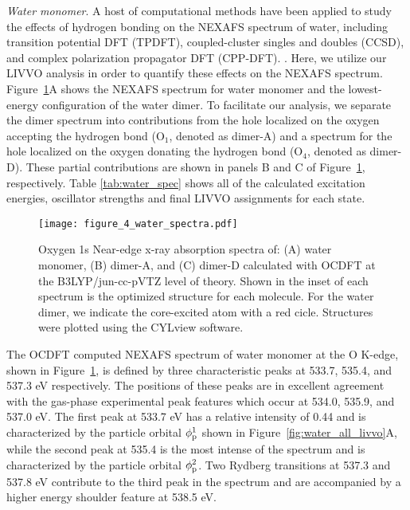 \documentclass{article}
\begin{document}
\textit{Water monomer}. 
A host of computational methods have been applied to study the effects of hydrogen bonding on the NEXAFS spectrum of water, including transition potential DFT (TPDFT), \cite{prendergast_x-ray_2006-2,iannuzzi_x-ray_2008,leetmaa_theoretical_2010,hetenyi_calculation_2004,cavalleri_half_2005} coupled-cluster singles and doubles (CCSD), \cite{coriani_coupled-cluster_2012,coriani_asymmetric-lanczos-chain-driven_2012,fransson_requirements_2016} and complex polarization propagator DFT (CPP-DFT). \cite{ekstrom_x-ray_2006}. Here, we utilize our LIVVO analysis in order to quantify these effects on the NEXAFS spectrum.  
Figure~\ref{fig:water_spec}A shows the NEXAFS spectrum for water monomer and the lowest-energy configuration of the water dimer.
To facilitate our analysis, we separate the dimer spectrum into contributions from the hole localized on the oxygen accepting the hydrogen bond (O$_1$, denoted as dimer-A) and a spectrum for the hole localized on the oxygen donating the hydrogen bond (O$_4$, denoted as dimer-D).
These partial contributions are shown in panels B and C of Figure~\ref{fig:water_spec}, respectively.
Table \ref{tab:water_spec} shows all of the calculated excitation energies, oscillator strengths and final LIVVO assignments for each state.

\begin{figure}[t!]
\centering
\texttt{[image: figure\_4\_water\_spectra.pdf]}
\caption{Oxygen 1s Near-edge x-ray absorption spectra of: (A) water monomer, (B) dimer-A, and (C) dimer-D calculated with OCDFT at the B3LYP/jun-cc-pVTZ level of theory. Shown in the inset of each spectrum is the optimized structure for each molecule. For the water dimer, we indicate the core-excited atom with a red cicle. Structures were plotted using the CYLview software.\cite{legault_cylview_2009}}
\label{fig:water_spec}
\end{figure} 

The OCDFT computed NEXAFS spectrum of water monomer at the O K-edge, shown in Figure~\ref{fig:water_spec}, is defined by three characteristic peaks at 533.7, 535.4, and 537.3 eV respectively.
The positions of these peaks are in excellent agreement with the gas-phase experimental peak features which occur at 534.0, 535.9, and 537.0 eV. \cite{schirmer_k-shell_1993}
The first peak at 533.7 eV has a relative intensity of 0.44 and is characterized by the particle orbital $\phi^1_{\rm p}$ shown in Figure~\ref{fig:water_all_livvo}A, while the second peak at 535.4 is the most intense of the spectrum and is characterized by the particle orbital $\phi^2_{\rm p}$.
Two Rydberg transitions at 537.3 and 537.8 eV contribute to the third peak in the spectrum and are accompanied by a higher energy shoulder feature at 538.5 eV.
\end{document}

